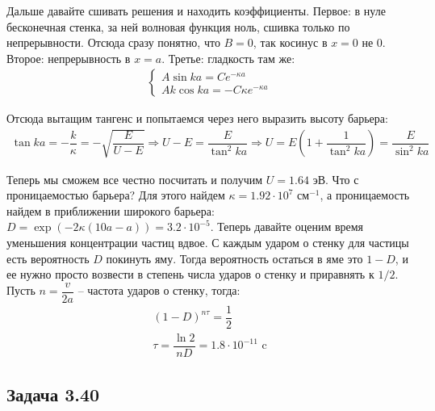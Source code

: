 \documentclass[12pt]{article}
\begin{document}
Дальше давайте сшивать решения и находить коэффициенты. Первое: в нуле бесконечная стенка, за ней волновая функция ноль, сшивка только по непрерывности. Отсюда сразу понятно, что $B=0$, так косинус в $x=0$ не 0. Второе: непрерывность в $x=a$. Третье: гладкость там же:
\begin{gather*}
    \begin{cases}
         A \sin{ka} = Ce^{-\kappa a} \\
         Ak \cos{ka} = -C\kappa e^{-\kappa a}
    \end{cases}
\end{gather*}

Отсюда вытащим тангенс и попытаемся через него выразить высоту барьера:
\begin{gather*}
    \tan{ka} = -\dfrac{k}{\kappa}= - \sqrt{\dfrac{E}{U-E}} \Rightarrow U-E = \dfrac{E}{\tan^2{ka}} \Rightarrow U = E(1 + \dfrac{1}{\tan^2{ka}}) = \dfrac{E}{\sin^2{ka}}
\end{gather*}

Теперь мы сможем все честно посчитать и получим $U = 1.64$ эВ. Что с проницаемостью барьера? Для этого найдем $\kappa =1.92\cdot 10^7 \text{ см}^{-1}$, а проницаемость найдем в приближении широкого барьера: $D = \exp{\left( -2\kappa(10a-a)\right)} = 3.2\cdot10^{-5}$.
Теперь давайте оценим время уменьшения концентрации частиц вдвое. С каждым ударом о стенку для частицы есть вероятность $D$ покинуть яму. Тогда вероятность остаться в яме это $1-D$, и ее нужно просто возвести в степень числа ударов о стенку и приравнять к $1/2$. Пусть $n=\dfrac{v}{2a}$ -- частота ударов о стенку, тогда:
\begin{gather*}
    (1-D)^{n\tau} = \dfrac{1}{2}\\
    \tau = \dfrac{\ln{2}}{nD} = 1.8\cdot 10^{-11} \text{ c}
\end{gather*}

\subsection{Задача 3.40}
\label{task_3.40}
\end{document}
